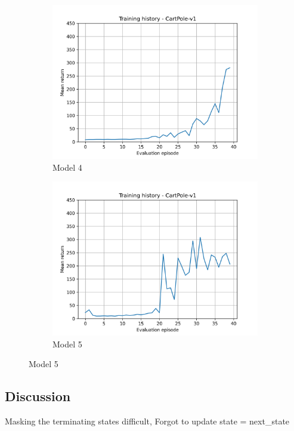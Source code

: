 \documentclass[a4paper,10pt]{article}
\begin{document}
\begin{figure}[htbp]
  \begin{subfigure}{0.3\textwidth}
    \includegraphics[width=\textwidth]{figures/CartPole_history_4.png}
    \caption{Model 4}
    \label{fig:image2}
  \end{subfigure}
  \label{fig:both_images}
   \hfill
  \begin{subfigure}{0.3\textwidth}
    \includegraphics[width=\textwidth]{figures/CartPole_history_5.png}
    \caption{Model 5}
    \label{fig:image2}
  \end{subfigure}
  \label{fig:both_images}
\end{figure}

\subsection*{Discussion}
Masking the terminating states difficult,
Forgot to update state = next\_state
\end{document}
